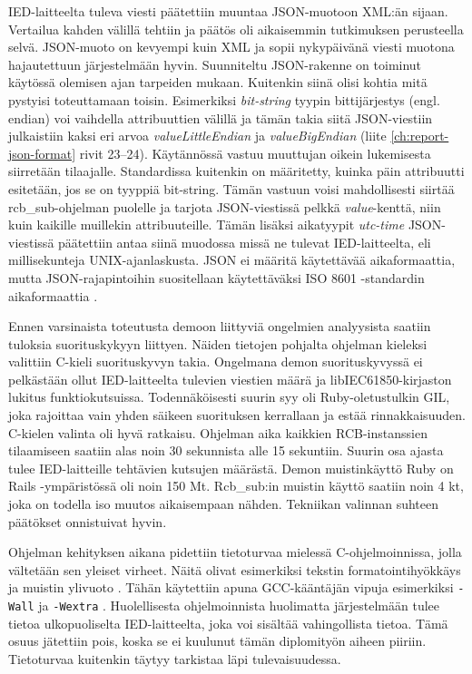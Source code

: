 IED-laitteelta tuleva viesti päätettiin muuntaa JSON-muotoon XML:än sijaan. Vertailua kahden välillä tehtiin ja päätös oli aikaisemmin tutkimuksen perusteella selvä. JSON-muoto on kevyempi kuin XML ja sopii nykypäivänä viesti muotona hajautettuun järjestelmään hyvin. Suunniteltu JSON-rakenne on toiminut käytössä olemisen ajan tarpeiden mukaan. Kuitenkin siinä olisi kohtia mitä pystyisi toteuttamaan toisin. Esimerkiksi \emph{bit-string} tyypin bittijärjestys (engl. endian) voi vaihdella attribuuttien välillä ja tämän takia siitä JSON-viestiin julkaistiin kaksi eri arvoa \emph{valueLittleEndian} ja \emph{valueBigEndian} (liite \ref{ch:report-json-format} rivit 23--24). Käytännössä vastuu muuttujan oikein lukemisesta siirretään tilaajalle. Standardissa kuitenkin on määritetty, kuinka päin attribuutti esitetään, jos se on tyyppiä bit-string. Tämän vastuun voisi mahdollisesti siirtää rcb\_sub-ohjelman puolelle ja tarjota JSON-viestissä pelkkä \emph{value}-kenttä, niin kuin kaikille muillekin attribuuteille. Tämän lisäksi aikatyypit \emph{utc-time} JSON-viestissä päätettiin antaa siinä muodossa missä ne tulevat IED-laitteelta, eli millisekunteja UNIX-ajanlaskusta. JSON ei määritä käytettävää aikaformaattia, mutta JSON-rajapintoihin suositellaan käytettäväksi ISO 8601 -standardin aikaformaattia \cite{json-api-specification}.

Ennen varsinaista toteutusta demoon liittyviä ongelmien analyysista saatiin tuloksia suorituskykyyn liittyen. Näiden tietojen pohjalta ohjelman kieleksi valittiin C-kieli suorituskyvyn takia. Ongelmana demon suorituskyvyssä ei pelkästään ollut IED-laitteelta tulevien viestien määrä ja libIEC61850-kirjaston lukitus funktiokutsuissa. Todennäköisesti suurin syy oli Ruby-oletustulkin GIL, joka rajoittaa vain yhden säikeen suorituksen kerrallaan ja estää rinnakkaisuuden. C-kielen valinta oli hyvä ratkaisu. Ohjelman aika kaikkien RCB-instanssien tilaamiseen saatiin alas noin 30 sekunnista alle 15 sekuntiin. Suurin osa ajasta tulee IED-laitteille tehtävien kutsujen määrästä. Demon muistinkäyttö Ruby on Rails -ympäristössä oli noin 150 Mt. Rcb\_sub:in muistin käyttö saatiin noin 4 kt, joka on todella iso muutos aikaisempaan nähden. Tekniikan valinnan suhteen päätökset onnistuivat hyvin.

Ohjelman kehityksen aikana pidettiin tietoturvaa mielessä C-ohjelmoinnissa, jolla vältetään sen yleiset virheet. Näitä olivat esimerkiksi tekstin formatointihyökkäys \cite{format-string-attack} ja muistin ylivuoto \cite{buffer-overflow-attack}. Tähän käytettiin apuna GCC-kääntäjän vipuja esimerkiksi \texttt{-Wall} ja \texttt{-Wextra} \cite{gcc-manual-warnings}. Huolellisesta ohjelmoinnista huolimatta järjestelmään tulee tietoa ulkopuoliselta IED-laitteelta, joka voi sisältää vahingollista tietoa. Tämä osuus jätettiin pois, koska se ei kuulunut tämän diplomityön aiheen piiriin. Tietoturvaa kuitenkin täytyy tarkistaa läpi tulevaisuudessa.

